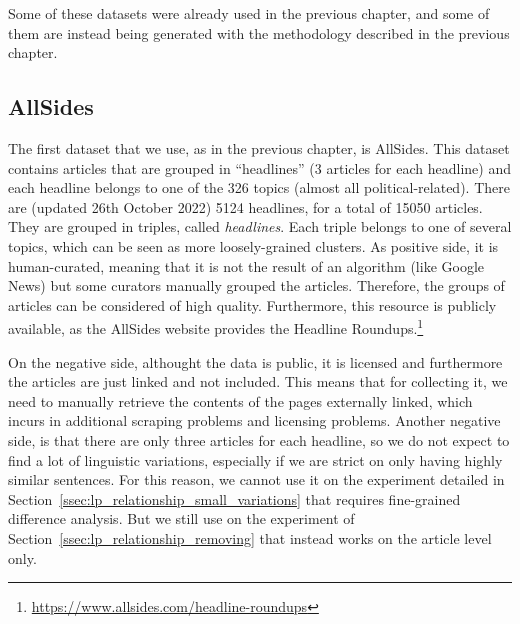 Some of these datasets were already used in the previous chapter, and some of them are instead being generated with the methodology described in the previous chapter.



\subsection{AllSides}

The first dataset that we use, as in the previous chapter, is AllSides.
This dataset contains articles that are grouped in “headlines” (3 articles for each headline) and each headline belongs to one of the 326 topics (almost all political-related). There are (updated 26th October 2022) 5124 headlines, for a total of 15050 articles. They are grouped in triples, called \emph{headlines}. Each triple belongs to one of several topics, which can be seen as more loosely-grained clusters. 
As positive side, it is human-curated, meaning that it is not the result of an algorithm (like Google News) but some curators manually grouped the articles. Therefore, the groups of articles can be considered of high quality.
Furthermore, this resource is publicly available, as the AllSides website provides the Headline Roundups.\footnote{\url{https://www.allsides.com/headline-roundups}}

On the negative side, althought the data is public, it is licensed and furthermore the articles are just linked and not included.
This means that for collecting it, we need to manually retrieve the contents of the pages externally linked, which incurs in additional scraping problems and licensing problems.
Another negative side, is that there are only three articles for each headline, so we do not expect to find a lot of linguistic variations, especially if we are strict on only having highly similar sentences. For this reason, we cannot use it on the experiment detailed in Section~\ref{ssec:lp_relationship_small_variations} that requires fine-grained difference analysis. But we still use on the experiment of Section~\ref{ssec:lp_relationship_removing} that instead works on the article level only.

